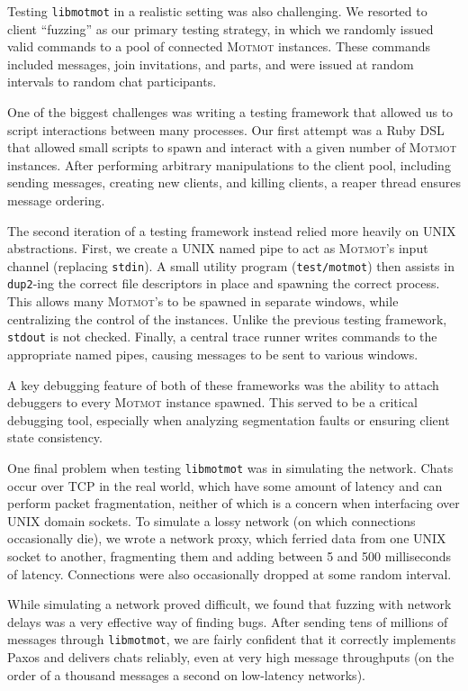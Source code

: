 \documentclass{sig-alternate}
\newcommand\Motmot{\textsc{Motmot}\xspace}
\newcommand\libmotmot{\texttt{libmotmot}\xspace}
\begin{document}
Testing \libmotmot in a realistic setting was also challenging. We resorted to
client ``fuzzing'' as our primary testing strategy, in which we randomly issued
valid commands to a pool of connected \Motmot instances. These commands included
messages, join invitations, and parts, and were issued at random intervals to
random chat participants.

One of the biggest challenges was writing a testing framework that allowed us to
script interactions between many processes. Our first attempt was a Ruby DSL
that allowed small scripts to spawn and interact with a given number of \Motmot
instances. After performing arbitrary manipulations to the client pool,
including sending messages, creating new clients, and killing clients, a reaper
thread ensures message ordering.

The second iteration of a testing framework instead relied more heavily on UNIX
abstractions. First, we create a UNIX named pipe to act as \Motmot's input
channel (replacing \texttt{stdin}). A small utility program
(\texttt{test/motmot}) then assists in \texttt{dup2}-ing the correct file
descriptors in place and spawning the correct process. This allows many
\Motmot's to be spawned in separate windows, while centralizing the control of
the instances. Unlike the previous testing framework, \texttt{stdout} is not
checked. Finally, a central trace runner writes commands to the appropriate
named pipes, causing messages to be sent to various windows.

A key debugging feature of both of these frameworks was the ability to attach
debuggers to every \Motmot instance spawned. This served to be a critical
debugging tool, especially when analyzing segmentation faults or ensuring client
state consistency.

One final problem when testing \libmotmot was in simulating the network.  Chats
occur over TCP in the real world, which have some amount of latency and can
perform packet fragmentation, neither of which is a concern when interfacing
over UNIX domain sockets. To simulate a lossy network (on which connections
occasionally die), we wrote a network proxy, which ferried data from one UNIX
socket to another, fragmenting them and adding between 5 and 500 milliseconds of
latency. Connections were also occasionally dropped at some random interval.

While simulating a network proved difficult, we found that fuzzing with network
delays was a very effective way of finding bugs. After sending tens of millions
of messages through \libmotmot, we are fairly confident that it correctly
implements Paxos and delivers chats reliably, even at very high message
throughputs (on the order of a thousand messages a second on low-latency
networks).
\end{document}
